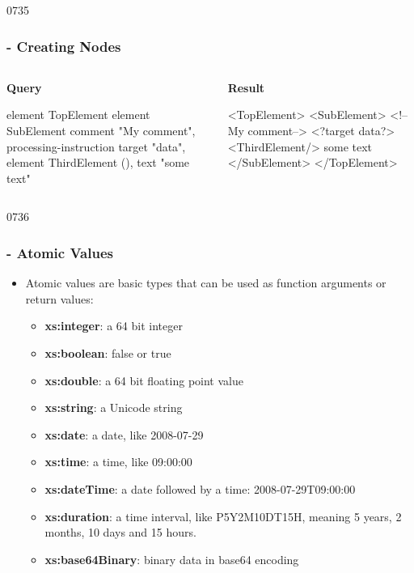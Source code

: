 \begin{slide}[fragile]{0735}
\frametitle{ - Creating Nodes}
\begin{columns}
  \begin{column}{50mm}
    \textbf{Query}
    \begin{xml}
element TopElement
{
  element SubElement
  {
    comment {"My comment"},
    processing-instruction
           target {"data"},
    element ThirdElement {()},
    text {"some text"}
  }
}      
    \end{xml}
  \end{column}
  \begin{column}{50mm}
   \textbf{Result}
   \begin{xml}
<TopElement>
  <SubElement>
    <!--My comment-->
    <?target data?>
    <ThirdElement/>
    some text
  </SubElement>
</TopElement>
     
   \end{xml}
  \end{column}
\end{columns}
\end{slide}

\begin{slide}{0736}\frametitle{ - Atomic Values}
\begin{itemize}
\item Atomic values are basic types that can be used as function arguments or return values:
\begin{itemize}
\item \textbf{xs:integer}: a 64 bit integer
\item \textbf{xs:boolean}: false or true
\item \textbf{xs:double}: a 64 bit floating point value
\item \textbf{xs:string}: a Unicode string 
\item \textbf{xs:date}: a date, like 2008-07-29
\item \textbf{xs:time}: a time, like 09:00:00
\item \textbf{xs:dateTime}: a date followed by a time: 2008-07-29T09:00:00
\item \textbf{xs:duration}: a time interval, like P5Y2M10DT15H, meaning 5 years, 2 months, 10 days and 15 hours.
\item \textbf{xs:base64Binary}: binary data in base64 encoding
\end{itemize}
\end{itemize}
\end{slide}


